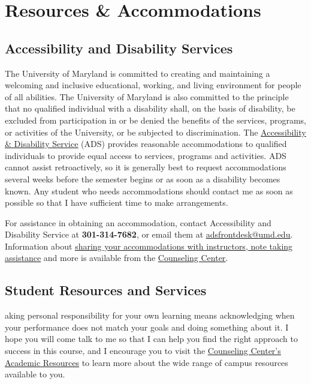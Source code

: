 \documentclass[11pt,usenames,dvipsnames,svgnames,x11names,letterpaper]{article}
\newcommand{\urllink}[2]{\href{#1}{\textcolor{Tomato3}{{{\tiny\faChevronRight}\uline{#2}}}}}
\begin{document}
\section{Resources \& Accommodations}

\subsection{Accessibility and Disability Services}


The University of Maryland is committed to creating and maintaining a welcoming and inclusive educational,
working, and living environment for people of all abilities. The University of Maryland is also committed to the
principle that no qualified individual with a disability shall, on the basis of disability, be excluded from participation
in or be denied the benefits of the services, programs, or activities of the University, or be subjected to
discrimination. The \urllink{https://counseling.umd.edu/ads}{Accessibility \& Disability Service} (ADS) provides reasonable accommodations to qualified
individuals to provide equal access to services, programs and activities. ADS cannot assist retroactively, so it is
generally best to request accommodations several weeks before the semester begins or as soon as a disability
becomes known. Any student who needs accommodations should contact me as soon as possible so that I have
sufficient time to make arrangements.

\vspace{0.3cm}
For assistance in obtaining an accommodation, contact Accessibility and Disability Service at \textbf{301-314-7682}, or email
them at \urllink{emailto:adsfrontdesk@umd.edu}{adsfrontdesk@umd.edu}. Information about \urllink{https://counseling.umd.edu/ads/currentads}{sharing your accommodations with instructors, note taking
assistance} and more is available from the \urllink{https://counseling.umd.edu/ads}{Counseling Center}.

\subsection{Student Resources and Services}
aking personal responsibility for your own learning means acknowledging when your performance does not match
your goals and doing something about it. I hope you will come talk to me so that I can help you find the right
approach to success in this course, and I encourage you to visit the \urllink{https://counseling.umd.edu/academic/resources/handouts}{Counseling Center's Academic Resources} to
learn more about the wide range of campus resources available to you.
\end{document}
